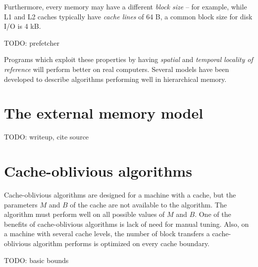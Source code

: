Furthermore, every memory may have a different \textit{block size} -- for example,
while L1 and L2 caches typically have \textit{cache lines} of 64 B, a common
block size for disk I/O is 4 kB.

TODO: prefetcher

Programs which exploit these properties by having \textit{spatial}
and \textit{temporal locality of reference} will perform better on real
computers. Several models have been developed to describe algorithms
performing well in hierarchical memory.

\section{The external memory model}
TODO: writeup, cite source

\section{Cache-oblivious algorithms}
Cache-oblivious algorithms are designed for a machine with a cache, but
the parameters $M$ and $B$ of the cache are not available to the algorithm.
The algorithm must perform well on all possible values of $M$ and $B$.
One of the benefits of cache-oblivious algorithms is lack of need for manual
tuning. Also, on a machine with several cache levels, the number of block transfers
a cache-oblivious algorithm performs is optimized on every cache boundary.

TODO: basic bounds
